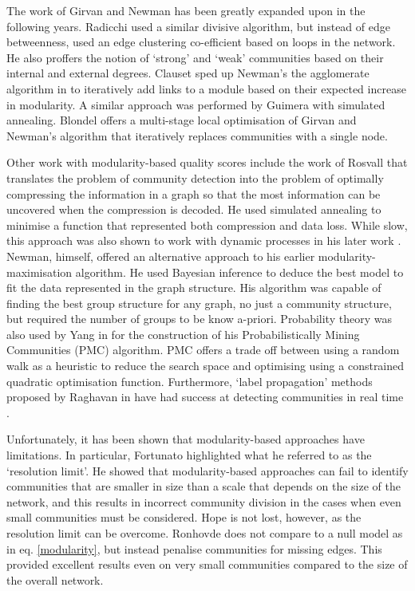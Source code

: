 \documentclass{report}
\begin{document}
The work of Girvan and Newman has been greatly expanded upon in the following years. Radicchi used a similar divisive algorithm, but instead of edge betweenness, used an edge clustering co-efficient based on loops in the network. He also proffers the notion of `strong' and `weak' communities based on their internal and external degrees. Clauset \cite{clauset2004finding} sped up Newman's the agglomerate algorithm in \cite{newman2005power} to iteratively add links to a module based on their expected increase in modularity. A similar approach was performed by Guimera \cite{guimera2005functional} with simulated annealing. Blondel \cite{blondel2008fast} offers a multi-stage local optimisation of Girvan and Newman's algorithm that iteratively replaces communities with a single node. 

Other work with modularity-based quality scores include the work of Rosvall \cite{rosvall2007information} that translates the problem of community detection into the problem of optimally compressing the information in a graph so that the most information can be uncovered when the compression is decoded. He used simulated annealing to minimise a function that represented both compression and data loss. While slow, this approach was also shown to work with dynamic processes in his later work \cite{rosvall2008maps}. Newman, himself, offered an alternative approach to his earlier modularity-maximisation algorithm. He used Bayesian inference to deduce the best model to fit the data represented in the graph structure. His algorithm was capable of finding the best group structure for any graph, no just a community structure, but required the number of groups to be know a-priori. Probability theory was also used by Yang in \cite{yang2013hierarchical} for the construction of his Probabilistically Mining Communities (PMC) algorithm. PMC offers a trade off between using a random walk as a heuristic to reduce the search space and optimising using a constrained quadratic optimisation function. Furthermore, `label propagation' methods proposed by Raghavan in \cite{raghavan2007near} have had success at detecting communities in real time \cite{leung2009towards}.

Unfortunately, it has been shown that modularity-based approaches have limitations. In particular, Fortunato \cite{fortunato2007resolution} highlighted what he referred to as the `resolution limit'. He showed that modularity-based approaches can fail to identify communities that are smaller in size than a scale that depends on the size of the network, and this results in incorrect community division in the cases when even small communities must be considered. Hope is not lost, however, as the resolution limit can be overcome. Ronhovde \cite{ronhovde2010local} does not compare to a null model as in eq. \ref{modularity}, but instead penalise communities for missing edges. This provided excellent results even on very small communities compared to the size of the overall network. 
\end{document}
